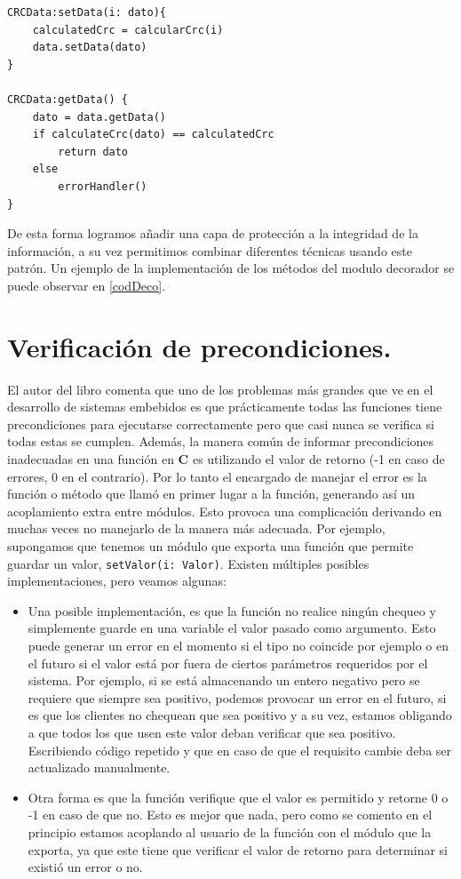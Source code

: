 \begin{lstlisting}[caption=Implementación métodos setData y getData,label={codDeco}]
CRCData:setData(i: dato){
    calculatedCrc = calcularCrc(i)
    data.setData(dato)
}

CRCData:getData() {
    dato = data.getData()
    if calculateCrc(dato) == calculatedCrc
        return dato
    else
        errorHandler()
}
\end{lstlisting}

De esta forma logramos añadir una capa de protección a la integridad de la información, a su vez permitimos combinar diferentes técnicas usando este patrón. Un ejemplo de la implementación de los métodos del modulo decorador se puede observar en \ref{codDeco}.

\section{Verificación de precondiciones.}
El autor del libro comenta que uno de los problemas más grandes que ve en el desarrollo de sistemas embebidos es que prácticamente todas las funciones tiene precondiciones para ejecutarse correctamente pero que casi nunca se verifica si todas estas se cumplen. Además, la manera común de informar precondiciones inadecuadas en una función en \textbf{C} es utilizando el valor de retorno (-1 en caso de errores, 0 en el contrario). Por lo tanto el encargado de manejar el error es la función o método que llamó en primer lugar a la función, generando así un acoplamiento extra entre módulos. Esto provoca una complicación derivando en muchas veces no manejarlo de la manera más adecuada. Por ejemplo, supongamos que tenemos un módulo que exporta una función que permite guardar un valor, \verb|setValor(i: Valor)|. Existen múltiples posibles implementaciones, pero veamos algunas:
\begin{itemize}
    \item Una posible implementación, es que la función no realice ningún chequeo y simplemente guarde en una variable el valor pasado como argumento. Esto puede generar un error en el momento si el tipo no coincide por ejemplo o en el futuro si el valor está por fuera de ciertos parámetros requeridos por el sistema. Por ejemplo, si se está almacenando un entero negativo pero se requiere que siempre sea positivo, podemos provocar un error en el futuro, si es que los clientes no chequean que sea positivo y a su vez, estamos obligando a que todos los que usen este valor deban verificar que sea positivo. Escribiendo código repetido y que en caso de que el requisito cambie deba ser actualizado manualmente.
    \item Otra forma es que la función verifique que el valor es permitido y retorne 0 o -1 en caso de que no. Esto es mejor que nada, pero como se comento en el principio estamos acoplando al usuario de la función con el módulo que la exporta, ya que este tiene que verificar el valor de retorno para determinar si existió un error o no.
\end{itemize}

